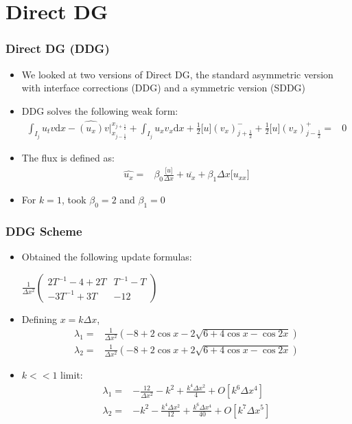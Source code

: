 \documentclass[serif,12pt]{beamer}
\begin{document}
\section{Direct DG}
\begin{frame}
\frametitle{Direct DG (DDG)}
\begin{itemize}
	\item We looked at two versions of Direct DG, the standard asymmetric version with interface corrections (DDG) and a symmetric version (SDDG)
	\item DDG solves the following weak form:
	\begin{align*}
		\int_{I_j} u_t v \mathrm{d}x -\widehat{(u_x)}v\bigr|_{x_{j-\frac{1}{2}}}^{x_{j+\frac{1}{2}}}+\int_{I_j} u_x v_x \mathrm{d}x+ \frac{1}{2}\lbrack u\rbrack(v_x)_{j+\frac{1}{2}}^- + \frac{1}{2}\lbrack u\rbrack(v_x)_{j-\frac{1}{2}}^+= & 0
	\end{align*}
	\item The flux is defined as:
	\begin{align*}
		\widehat{u_x} = & \beta_0 \frac{\lbrack u \rbrack}{\Delta x} + \overline{u_x} + \beta_1 \Delta x \lbrack u_{xx} \rbrack
	\end{align*}
	\item For $k=1$, took $\beta_0 = 2$ and $\beta_1 = 0$
\end{itemize}
\end{frame}

\begin{frame}
\frametitle{DDG Scheme}
\begin{itemize}
	\item Obtained the following update formulas:\\
	\begin{center}
		$\frac{1}{\Delta x^2}\left(
		\begin{array}{cc}
		2T^{-1} -4+2 T & T^{-1}- T \\
		 -3 T^{-1} +3 T & -12
		\end{array}
		\right)$
	\end{center}
	\item Defining $x = k\Delta x$,
		\begin{align*}
			\lambda_1 = & \frac{1}{\Delta x^2}\left(-8 + 2 \cos x - 2 \sqrt{6 + 4 \cos x - \cos 2x}\right)\\
			\lambda_2 = & \frac{1}{\Delta x^2}\left(-8 + 2 \cos x + 2 \sqrt{6 + 4 \cos x - \cos 2x}\right)
		\end{align*}
		\item $k << 1$ limit:
		\begin{align*}
			\lambda_1 = & -\frac{12}{\Delta x^2} - k^2 + \frac{k^4\Delta x^2}{4} + O[k^6\Delta x^4]\\
			\lambda_2 = & -k^2 - \frac{k^4\Delta x^2}{12} + \frac{k^6 \Delta x^4}{40} + O[k^7\Delta x^5]
		\end{align*}
\end{itemize}
\end{frame}
\end{document}
